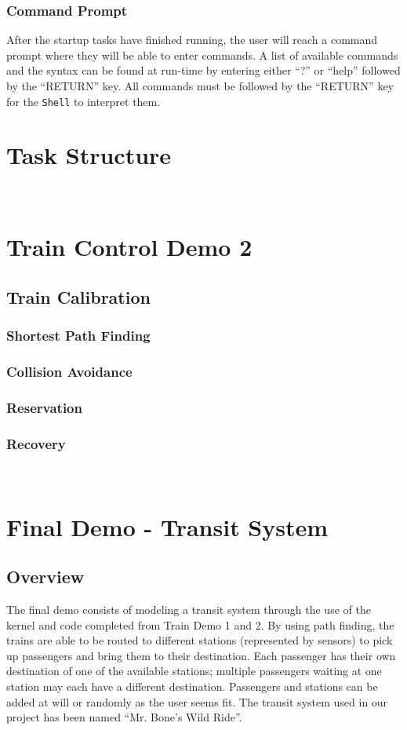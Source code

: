 \documentclass[12pt]{article}
\begin{document}
\subsubsection{Command Prompt}
After the startup tasks have finished running, the user will reach a command prompt where they will be able to enter commands.  A list of available commands and the syntax can be found at run-time by entering either ``?'' or ``help'' followed by the ``RETURN'' key.  All commands must be followed by the ``RETURN'' key for the {\tt Shell} to interpret them.
\\[2\baselineskip]
\section{Task Structure}
\\[2\baselineskip]
\section{Train Control Demo 2}
\subsection{Train Calibration}
\subsubsection{Shortest Path Finding}
\subsubsection{Collision Avoidance}
\subsubsection{Reservation}
\subsubsection{Recovery}
\\[2\baselineskip]
\section{Final Demo - Transit System}
\subsection{Overview}
The final demo consists of modeling a transit system through the use of the kernel and code completed from Train Demo 1 and 2.  By using path finding, the trains are able to be routed to different stations (represented by sensors) to pick up passengers and bring them to their destination.  Each passenger has their own destination of one of the available stations; multiple passengers waiting at one station may each have a different destination.  Passengers and stations can be added at will or randomly as the user seems fit.  The transit system used in our project has been named ``Mr. Bone's Wild Ride''.
\\[1\baselineskip]
\end{document}
